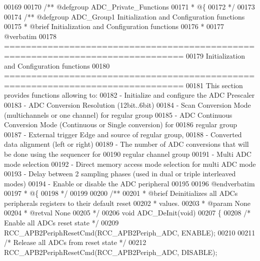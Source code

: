 \begin{DoxyCode}
00169 
00170 \textcolor{comment}{/** @defgroup ADC\_Private\_Functions}
00171 \textcolor{comment}{  * @\{}
00172 \textcolor{comment}{  */}
00173 
00174 \textcolor{comment}{/** @defgroup ADC\_Group1 Initialization and Configuration functions}
00175 \textcolor{comment}{ *  @brief    Initialization and Configuration functions }
00176 \textcolor{comment}{ *}
00177 \textcolor{comment}{@verbatim    }
00178 \textcolor{comment}{ ===============================================================================}
00179 \textcolor{comment}{                      Initialization and Configuration functions}
00180 \textcolor{comment}{ ===============================================================================  }
00181 \textcolor{comment}{  This section provides functions allowing to:}
00182 \textcolor{comment}{   - Initialize and configure the ADC Prescaler}
00183 \textcolor{comment}{   - ADC Conversion Resolution (12bit..6bit)}
00184 \textcolor{comment}{   - Scan Conversion Mode (multichannels or one channel) for regular group}
00185 \textcolor{comment}{   - ADC Continuous Conversion Mode (Continuous or Single conversion) for }
00186 \textcolor{comment}{     regular group}
00187 \textcolor{comment}{   - External trigger Edge and source of regular group, }
00188 \textcolor{comment}{   - Converted data alignment (left or right)}
00189 \textcolor{comment}{   - The number of ADC conversions that will be done using the sequencer for }
00190 \textcolor{comment}{     regular channel group}
00191 \textcolor{comment}{   - Multi ADC mode selection}
00192 \textcolor{comment}{   - Direct memory access mode selection for multi ADC mode  }
00193 \textcolor{comment}{   - Delay between 2 sampling phases (used in dual or triple interleaved modes)}
00194 \textcolor{comment}{   - Enable or disable the ADC peripheral}
00195 \textcolor{comment}{   }
00196 \textcolor{comment}{@endverbatim}
00197 \textcolor{comment}{  * @\{}
00198 \textcolor{comment}{  */}
00199 
00200 \textcolor{comment}{/**}
00201 \textcolor{comment}{  * @brief  Deinitializes all ADCs peripherals registers to their default reset }
00202 \textcolor{comment}{  *         values.}
00203 \textcolor{comment}{  * @param  None}
00204 \textcolor{comment}{  * @retval None}
00205 \textcolor{comment}{  */}
00206 \textcolor{keywordtype}{void} ADC_DeInit(\textcolor{keywordtype}{void})
00207 \{
00208   \textcolor{comment}{/* Enable all ADCs reset state */}
00209   RCC_APB2PeriphResetCmd(RCC_APB2Periph_ADC, ENABLE);
00210 
00211   \textcolor{comment}{/* Release all ADCs from reset state */}
00212   RCC_APB2PeriphResetCmd(RCC_APB2Periph_ADC, DISABLE);

\end{DoxyCode}
